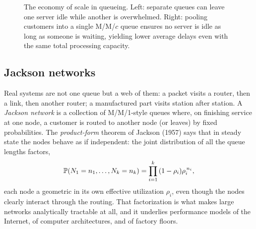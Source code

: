 \begin{figure}[htbp]
\centering
{}
\caption{The economy of scale in queueing. Left: separate queues can leave one server idle while another is overwhelmed. Right: pooling customers into a single M/M/$c$ queue ensures no server is idle as long as someone is waiting, yielding lower average delays even with the same total processing capacity.}
\label{ch27:fig-pooling}
\end{figure}

\subsection{Jackson networks}

Real systems are not one queue but a web of them: a packet visits a router, then a link, then another
router; a manufactured part visits station after station. A \emph{Jackson network} is a collection of
M/M/1-style queues where, on finishing service at one node, a customer is routed to another node
(or leaves) by fixed probabilities. The \emph{product-form} theorem of Jackson (1957)
says that in steady state the nodes behave as if independent: the joint distribution of all
the queue lengths factors,
\[
  \P(N_1 = n_1, \dots, N_k = n_k) = \prod_{i=1}^{k}\,(1-\rho_i)\rho_i^{\,n_i},
\]
each node a geometric in its own effective utilization $\rho_i$, even though the nodes clearly
interact through the routing. That factorization is what makes large networks analytically tractable
at all, and it underlies performance models of the Internet, of computer architectures, and of
factory floors.

